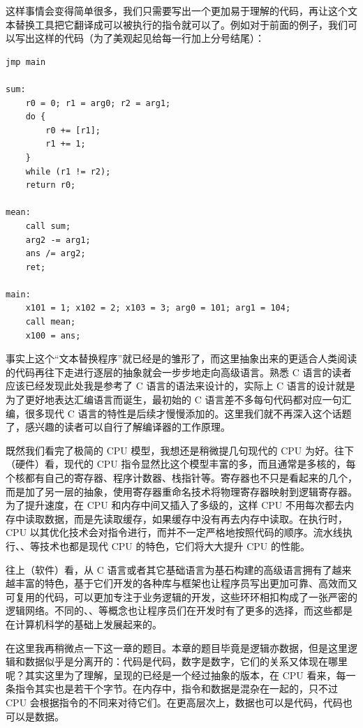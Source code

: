 这样事情会变得简单很多，我们只需要写出一个更加易于理解的代码，再让这个文本替换工具把它翻译成可以被执行的指令就可以了。例如对于前面的例子，我们可以写出这样的代码（为了美观起见给每一行加上分号结尾）：
\begin{verbatim}
jmp main

sum:
    r0 = 0; r1 = arg0; r2 = arg1;
    do {
        r0 += [r1];
        r1 += 1;
    } 
    while (r1 != r2);
    return r0;

mean:
    call sum;
    arg2 -= arg1;
    ans /= arg2;
    ret;

main:
    x101 = 1; x102 = 2; x103 = 3; arg0 = 101; arg1 = 104;
    call mean;
    x100 = ans;
\end{verbatim}

事实上这个“文本替换程序”就已经是的雏形了，而这里抽象出来的更适合人类阅读的代码再往下走进行逐层的抽象就会一步步地走向高级语言。熟悉 C 语言的读者应该已经发现此处我是参考了 C 语言的语法来设计的，实际上 C 语言的设计就是为了更好地表达汇编语言而诞生，最初始的 C 语言差不多每句代码都对应一句汇编，很多现代 C 语言的特性是后续才慢慢添加的。这里我们就不再深入这个话题了，感兴趣的读者可以自行了解编译器的工作原理。

既然我们看完了极简的 CPU 模型，我想还是稍微提几句现代的 CPU 为好。往下（硬件）看，现代的 CPU 指令显然比这个模型丰富的多，而且通常是多核的，每个核都有自己的寄存器、程序计数器、栈指针等。寄存器也不只是看起来的几个，而是加了另一层的抽象，使用寄存器重命名技术将物理寄存器映射到逻辑寄存器。为了提升速度，在 CPU 和内存中间又插入了多级的，这样 CPU 不用每次都去内存中读取数据，而是先读取缓存，如果缓存中没有再去内存中读取。在执行时，CPU 以其优化技术会对指令进行，而并不一定严格地按照代码的顺序。流水线执行、、等技术也都是现代 CPU 的特色，它们将大大提升 CPU 的性能。

往上（软件）看，从 C 语言或者其它基础语言为基石构建的高级语言拥有了越来越丰富的特色，基于它们开发的各种库与框架也让程序员写出更加可靠、高效而又可复用的代码，可以更加专注于业务逻辑的开发，这些环环相扣构成了一张严密的逻辑网络。不同的、、等概念也让程序员们在开发时有了更多的选择，而这些都是在计算机科学的基础上发展起来的。

在这里我再稍微点一下这一章的题目。本章的题目毕竟是逻辑亦数据，但是这里逻辑和数据似乎是分离开的：代码是代码，数字是数字，它们的关系又体现在哪里呢？其实这里为了理解，呈现的已经是一个经过抽象的版本，在 CPU 看来，每一条指令其实也是若干个字节。在内存中，指令和数据是混杂在一起的，只不过 CPU 会根据指令的不同来对待它们。在更高层次上，数据也可以是代码，代码也可以是数据。

